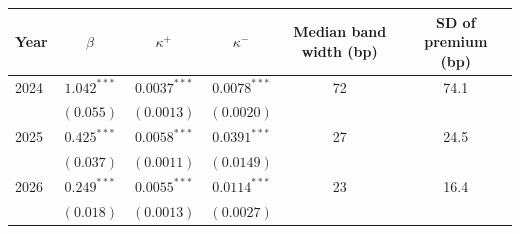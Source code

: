 \begin{tabular}{lccccc}
\toprule
 Year & $\beta$ & $\kappa^+$ & $\kappa^-$ & Median band width (bp) & SD of premium (bp) \\
\midrule
2024 & $1.042^{***}$ & $0.0037^{***}$ & $0.0078^{***}$ & 72 & 74.1 \\
 & $(0.055)$ & $(0.0013)$ & $(0.0020)$ & & \\
2025 & $0.425^{***}$ & $0.0058^{***}$ & $0.0391^{***}$ & 27 & 24.5 \\
 & $(0.037)$ & $(0.0011)$ & $(0.0149)$ & & \\
2026 & $0.249^{***}$ & $0.0055^{***}$ & $0.0114^{***}$ & 23 & 16.4 \\
 & $(0.018)$ & $(0.0013)$ & $(0.0027)$ & & \\
\bottomrule
\end{tabular}

